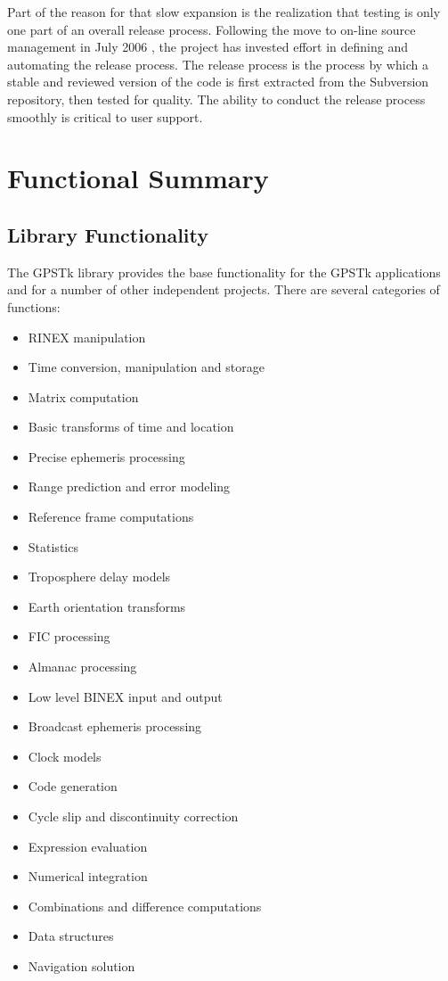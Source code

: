 \documentclass[letterpaper,ugly,10pt]{ion-gps}
\begin{document}
Part of the reason for that slow expansion is the realization that testing is only one part of an overall release process.  Following the move to on-line source management in July 2006 \cite{ion:gnss06}, the project has invested effort in defining and automating the release process. The release process is the process by which a stable and reviewed version of the code is first extracted from the Subversion repository, then tested for quality. The ability to conduct the release process smoothly is critical to user support.

\section*{Functional Summary}

\subsection*{Library Functionality}

The GPSTk library provides the base functionality for the GPSTk applications and for a number of other independent projects. There are several categories of functions:

\begin{itemize}
\item RINEX manipulation
\item Time conversion, manipulation and storage
\item Matrix computation
\item Basic transforms of time and location
\item Precise ephemeris processing
\item Range prediction and error modeling
\item Reference frame computations
\item Statistics
\item Troposphere delay models
\item Earth orientation transforms
\item FIC processing
\item Almanac processing
\item Low level BINEX input and output
\item Broadcast ephemeris processing
\item Clock models
\item Code generation
\item Cycle slip and discontinuity correction
\item Expression evaluation
\item Numerical integration
\item Combinations and difference computations
\item Data structures
\item Navigation solution
\end{itemize}
\end{document}
